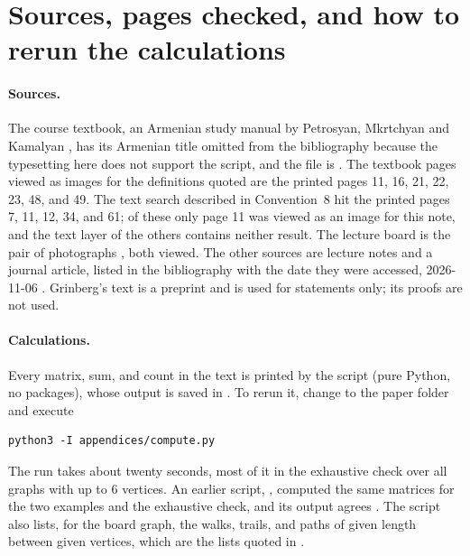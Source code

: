 \section{Sources, pages checked, and how to rerun the calculations}\label{app:provenance}

\paragraph{Sources.} The course textbook, an Armenian study manual by Petrosyan, Mkrtchyan and Kamalyan \cite{petrosyan2015grafneri}, has its Armenian title omitted from the bibliography because the typesetting here does not support the script, and the file is . The textbook pages viewed as images for the definitions quoted are the printed pages 11, 16, 21, 22, 23, 48, and 49. The text search described in Convention~8 hit the printed pages 7, 11, 12, 34, and 61; of these only page 11 was viewed as an image for this note, and the text layer of the others contains neither result. The lecture board is the pair of photographs \cite{whiteboard1,whiteboard2}, both viewed. The other sources are lecture notes and a journal article, listed in the bibliography with the date they were accessed, 2026-11-06 \cite{uogalway_adjacency_notes,gotti_mit18211_lec27,grinberg2025graph,bai2025adjacency,paramadevan2021properties,schost_cs341_module3}. Grinberg's text is a preprint and is used for statements only; its proofs are not used.

\paragraph{Calculations.} Every matrix, sum, and count in the text is printed by the script  (pure Python, no packages), whose output is saved in . To rerun it, change to the paper folder and execute
\begin{verbatim}
python3 -I appendices/compute.py
\end{verbatim}
The run takes about twenty seconds, most of it in the exhaustive check over all graphs with up to $6$ vertices. An earlier script, , computed the same matrices for the two examples and the exhaustive check, and its output agrees \cite{m3_check_script}. The script  \cite{author_compute_script} also lists, for the board graph, the walks, trails, and paths of given length between given vertices, which are the lists quoted in .

